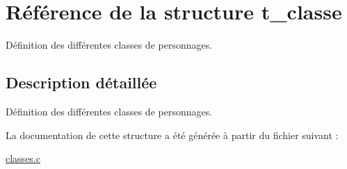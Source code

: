 \hypertarget{a00001}{}\section{Référence de la structure t\+\_\+classe}
\label{a00001}


Définition des différentes classes de personnages.  




\subsection{Description détaillée}
Définition des différentes classes de personnages. 

La documentation de cette structure a été générée à partir du fichier suivant \+:\begin{DoxyCompactItemize}
\item 
\hyperlink{a00002}{classes.\+c}\end{DoxyCompactItemize}
